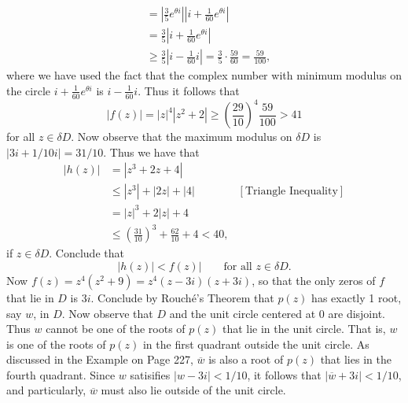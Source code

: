 \documentclass[9pt]{article}
\begin{document}
\begin{enumerate}
\begin{enumerate}
\begin{align*}
                     &= \left|\frac{3}{5}e^{\theta i}\right|\left|i +
                        \frac{1}{60}e^{\theta i}\right| \\
                     &= \frac{3}{5}\left|i +
                        \frac{1}{60}e^{\theta i}\right| \\
                     &\ge \frac{3}{5}\left|i - \frac{1}{60}i\right| =
                     \frac{3}{5} \cdot \frac{59}{60} = \frac{59}{100},
               \end{align*}
               where we have used the fact that the complex number with
               minimum modulus on the circle $i + \frac{1}{60}e^{\theta i}$ is
               $i - \frac{1}{60}i$. Thus it follows that
               $$|f(z)| = |z|^4|z^2 + 2| \ge
                 \left(\frac{29}{10}\right)^4\frac{59}{100} > 41$$
               for all $z \in \delta D$.
               Now observe that the maximum modulus on $\delta D$ is
               $|3i + 1/10i| = 31/10$. Thus we have that
               \begin{align*}
                  |h(z)| &= |z^3 + 2z + 4| \\
                     &\le |z^3| + |2z| + |4| &[\text{Triangle Inequality}] \\
                     &= |z|^3 + 2|z| + 4 \\
                     &\le \left(\frac{31}{10}\right)^3 + \frac{62}{10} + 4 < 40,
               \end{align*}
               if $z \in \delta D$. Conclude that
               $$|h(z)| < f(z)| \qquad \text{for all }z \in \delta D.$$
               Now $f(z) = z^4(z^2 + 9) = z^4(z - 3i)(z + 3i)$, so that the only
               zeros of $f$ that lie in $D$ is $3i$. Conclude by Rouch\'{e}'s
               Theorem that $p(z)$ has exactly 1 root, say $w$, in $D$. Now
               observe that $D$ and the unit circle centered at 0 are disjoint.
               Thus $w$ cannot be one of the roots of $p(z)$ that lie in the
               unit circle. That is, $w$ is one of the roots of $p(z)$ in the
               first quadrant outside the unit circle. As discussed in the
               Example on Page 227, $\overline{w}$ is also a root of $p(z)$ that
               lies in the fourth quadrant. Since $w$ satisifies
               $|w - 3i| < 1/10$, it follows that $|\overline{w} + 3i| < 1/10$,
               and particularly, $\overline{w}$ must also lie outside of the
               unit circle.
      \end{enumerate}
\end{enumerate}
\end{document}
